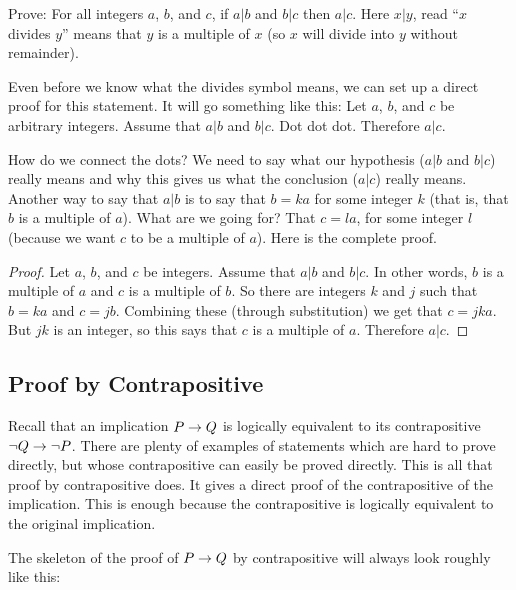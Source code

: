 \documentclass[12pt]{article}
\begin{document}
\begin{example}
Prove: For all integers $a$, $b$, and $c$, if $a|b$ and $b|c$ then $a|c$.  Here $x|y$, read ``$x$ divides $y$'' means that $y$ is a multiple of $x$ (so $x$ will divide into $y$ without remainder).

\begin{solution}
Even before we know what the divides symbol means, we can set up a direct proof for this statement.  It will go something like this: Let $a$, $b$, and $c$ be arbitrary integers.  Assume that $a|b$ and $b|c$.  Dot dot dot.  Therefore $a|c$.

How do we connect the dots?  We need to say what our hypothesis ($a|b$ and $b|c$) really means and why this gives us what the conclusion ($a|c$) really means.  Another way to say that $a|b$ is to say that $b = ka$ for some integer $k$ (that is, that $b$ is a multiple of $a$).  What are we going for?  That $c = la$, for some integer $l$ (because we want $c$ to be a multiple of $a$).  Here is the complete proof.

\begin{proof}
Let $a$, $b$, and $c$ be integers.  Assume that $a|b$ and $b|c$.  In other words, $b$ is a multiple of $a$ and $c$ is a multiple of $b$.  So there are integers $k$ and $j$ such that $b = ka$ and $c = jb$.  Combining these (through substitution) we get that $c = jka$.  But $jk$ is an integer, so this says that $c$ is a multiple of $a$.  Therefore $a|c$.
\end{proof}
\end{solution}
\end{example}



\subsection*{Proof by Contrapositive}

Recall that an implication $P \rightarrow Q$ is logically equivalent to its contrapositive $\neg Q \rightarrow \neg P$.  There are plenty of examples of statements which are hard to prove directly, but whose contrapositive can easily be proved directly.  This is all that proof by contrapositive does.  It gives a direct proof of the contrapositive of the implication.  This is enough because the contrapositive is logically equivalent to the original implication.

The skeleton of the proof of $P \rightarrow Q$ by contrapositive will always look roughly like this:
\end{document}
